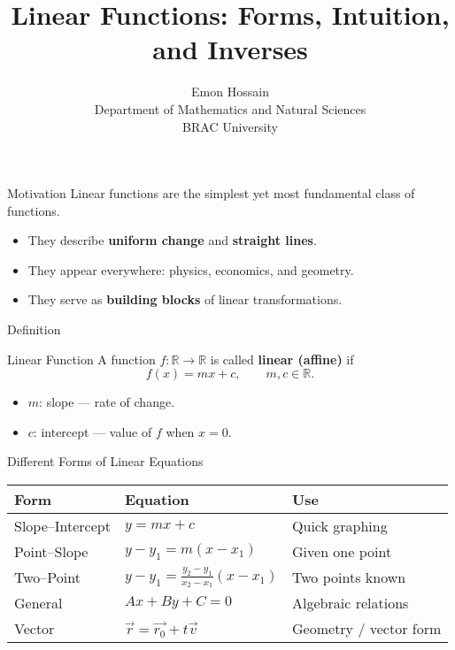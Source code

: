 \documentclass[aspectratio=169,10pt]{beamer}
\title[Linear Functions]{\textbf{Linear Functions: Forms, Intuition, and Inverses}}
\author[Emon Hossain]{Emon Hossain \\ Department of Mathematics and Natural Sciences \\ BRAC University}
\date{}
\begin{document}
\begin{frame}
    \titlepage
\end{frame}

\begin{frame}{Motivation}
Linear functions are the simplest yet most fundamental class of functions.
\pause

\begin{itemize}
    \item They describe \textbf{uniform change} and \textbf{straight lines}.
    \item They appear everywhere: physics, economics, and geometry.
    \item They serve as \textbf{building blocks} of linear transformations.
\end{itemize}
\end{frame}

\begin{frame}{Definition}
\begin{block}{Linear Function}
A function \( f:\mathbb{R}\to\mathbb{R} \) is called \textbf{linear (affine)} if
\[
f(x) = m x + c, \qquad m,c\in\mathbb{R}.
\]
\end{block}
\pause
\begin{itemize}
    \item \(m\): slope — rate of change.
    \item \(c\): intercept — value of \(f\) when \(x=0\).
\end{itemize}
\end{frame}

\begin{frame}{Different Forms of Linear Equations}
\begin{tabular}{lll}
\textbf{Form} & \textbf{Equation} & \textbf{Use} \\ \hline
Slope--Intercept & \(y = mx + c\) & Quick graphing \\
Point--Slope & \(y - y_1 = m(x - x_1)\) & Given one point \\
Two--Point & \(y - y_1 = \frac{y_2 - y_1}{x_2 - x_1}(x - x_1)\) & Two points known \\
General & \(Ax + By + C = 0\) & Algebraic relations \\
Vector & \(\vec{r}=\vec{r_0}+t\vec{v}\) & Geometry / vector form
\end{tabular}
\end{frame}
\end{document}
